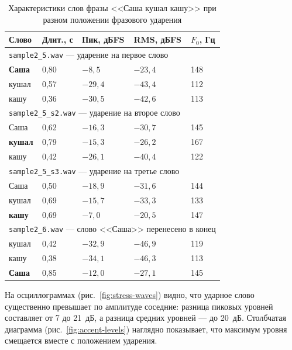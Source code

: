 \begin{table}[H]
	\centering
	\small
	\caption{Характеристики слов фразы <<Саша кушал кашу>> при разном
		положении фразового ударения}
	\label{tab:stress}
	\begin{tabular}{|l|l|l|l|l|}
		\hline
		Слово & Длит., с & Пик, дБFS & RMS, дБFS & $F_0$, Гц \\
		\hline
		\multicolumn{5}{|l|}{\texttt{sample2\_5.wav} --- ударение на первое слово} \\
		\hline
		\textbf{Саша} & 0,80 & $-8{,}5$ & $-23{,}4$ & 148 \\
		\hline
		кушал & 0,57 & $-29{,}4$ & $-43{,}4$ & 112 \\
		\hline
		кашу & 0,36 & $-30{,}5$ & $-42{,}6$ & 113 \\
		\hline
		\multicolumn{5}{|l|}{\texttt{sample2\_5\_s2.wav} --- ударение на второе слово} \\
		\hline
		Саша & 0,62 & $-16{,}3$ & $-30{,}7$ & 145 \\
		\hline
		\textbf{кушал} & 0,79 & $-15{,}3$ & $-26{,}2$ & 167 \\
		\hline
		кашу & 0,42 & $-26{,}1$ & $-40{,}4$ & 122 \\
		\hline
		\multicolumn{5}{|l|}{\texttt{sample2\_5\_s3.wav} --- ударение на третье слово} \\
		\hline
		Саша & 0,50 & $-18{,}9$ & $-31{,}6$ & 144 \\
		\hline
		кушал & 0,69 & $-15{,}7$ & $-33{,}3$ & 133 \\
		\hline
		\textbf{кашу} & 0,69 & $-7{,}0$ & $-20{,}5$ & 147 \\
		\hline
		\multicolumn{5}{|l|}{\texttt{sample2\_6.wav} --- слово <<Саша>> перенесено в конец} \\
		\hline
		кушал & 0,42 & $-32{,}9$ & $-46{,}9$ & 119 \\
		\hline
		кашу & 0,38 & $-34{,}1$ & $-46{,}3$ & 113 \\
		\hline
		\textbf{Саша} & 0,85 & $-12{,}0$ & $-27{,}1$ & 145 \\
		\hline
	\end{tabular}
\end{table}

На осциллограммах (рис.~\ref{fig:stress-waves}) видно, что ударное слово
существенно превышает по амплитуде соседние: разница пиковых уровней
составляет от 7 до 21~дБ, а разница средних уровней --- до 20~дБ.
Столбчатая диаграмма (рис.~\ref{fig:accent-levels}) наглядно показывает,
что максимум уровня смещается вместе с положением ударения.

